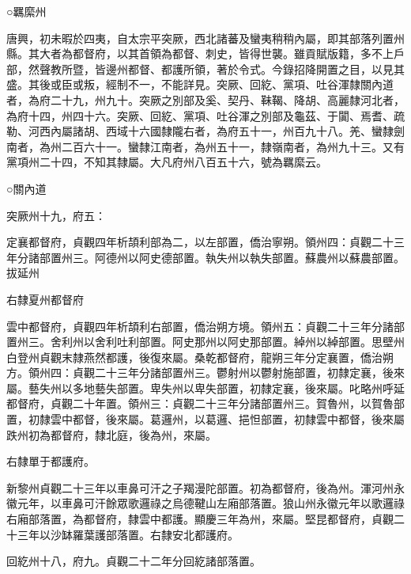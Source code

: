 
\begin{pinyinscope}

 ○羈縻州



 唐興，初未暇於四夷，自太宗平突厥，西北諸蕃及蠻夷稍稍內屬，即其部落列置州縣。其大者為都督府，以其首領為都督、刺史，皆得世襲。雖貢賦版籍，多不上戶部，然聲教所暨，皆邊州都督、都護所領，著於令式。今錄招降開置之目，以見其盛。其後或臣或叛，經制不一，不能詳見。突厥、回紇、黨項、吐谷渾隸關內道者，為府二十九，州九十。突厥之別部及奚、契丹、靺鞨、降胡、高麗隸河北者，為府十四，州四十六。突厥、回紇、黨項、吐谷渾之別部及龜茲、于闐、焉耆、疏勒、河西內屬諸胡、西域十六國隸隴右者，為府五十一，州百九十八。羌、蠻隸劍南者，為州二百六十一。蠻隸江南者，為州五十一，隸嶺南者，為州九十三。又有黨項州二十四，不知其隸屬。大凡府州八百五十六，號為羈縻云。



 ○關內道



 突厥州十九，府五：



 定襄都督府，貞觀四年析頡利部為二，以左部置，僑治寧朔。領州四：貞觀二十三年分諸部置州三。阿德州以阿史德部置。執失州以執失部置。蘇農州以蘇農部置。拔延州



 右隸夏州都督府



 雲中都督府，貞觀四年析頡利右部置，僑治朔方境。領州五：貞觀二十三年分諸部置州三。舍利州以舍利吐利部置。阿史那州以阿史那部置。綽州以綽部置。思壁州白登州貞觀末隸燕然都護，後復來屬。桑乾都督府，龍朔三年分定襄置，僑治朔方。領州四：貞觀二十三年分諸部置州三。鬱射州以鬱射施部置，初隸定襄，後來屬。藝失州以多地藝失部置。卑失州以卑失部置，初隸定襄，後來屬。叱略州呼延都督府，貞觀二十年置。領州三：貞觀二十三年分諸部置州三。賀魯州，以賀魯部置，初隸雲中都督，後來屬。葛邏州，以葛邏、挹怛部置，初隸雲中都督，後來屬跌州初為都督府，隸北庭，後為州，來屬。



 右隸單于都護府。



 新黎州貞觀二十三年以車鼻可汗之子羯漫陀部置。初為都督府，後為州。渾河州永徽元年，以車鼻可汗餘眾歌邏祿之烏德鞬山左廂部落置。狼山州永徽元年以歌邏祿右廂部落置，為都督府，隸雲中都護。顯慶三年為州，來屬。堅昆都督府，貞觀二十三年以沙缽羅葉護部落置。右隸安北都護府。



 回紇州十八，府九。貞觀二十二年分回紇諸部落置。




\end{pinyinscope}
